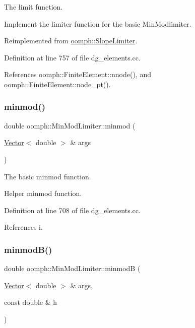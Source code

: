 The limit function. 

Implement the limiter function for the basic Min\+Modlimiter. 

Reimplemented from \hyperlink{classoomph_1_1SlopeLimiter_a8b836449e68921bade7cd580fa2f6ba7}{oomph\+::\+Slope\+Limiter}.



Definition at line 757 of file dg\+\_\+elements.\+cc.



References oomph\+::\+Finite\+Element\+::nnode(), and oomph\+::\+Finite\+Element\+::node\+\_\+pt().

\mbox{\label{classoomph_1_1MinModLimiter_a0c33f8903b7b06e79266e29a5c9cb087}} 
\subsubsection{\texorpdfstring{minmod()}{minmod()}}
{\footnotesize\ttfamily double oomph\+::\+Min\+Mod\+Limiter\+::minmod (\begin{DoxyParamCaption}\item[{\hyperlink{classoomph_1_1Vector}{Vector}$<$ double $>$ \&}]{args }\end{DoxyParamCaption})}



The basic minmod function. 

Helper minmod function. 

Definition at line 708 of file dg\+\_\+elements.\+cc.



References i.

\mbox{\label{classoomph_1_1MinModLimiter_a5ae4780f5da176b517c1380e29f74e0b}} 
\subsubsection{\texorpdfstring{minmod\+B()}{minmodB()}}
{\footnotesize\ttfamily double oomph\+::\+Min\+Mod\+Limiter\+::minmodB (\begin{DoxyParamCaption}\item[{\hyperlink{classoomph_1_1Vector}{Vector}$<$ double $>$ \&}]{args,  }\item[{const double \&}]{h }\end{DoxyParamCaption})}



